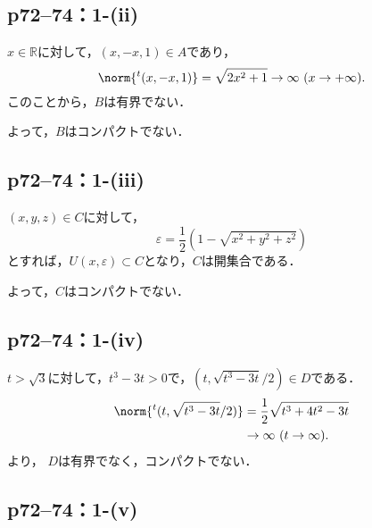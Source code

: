 \documentclass[a4paper,10pt,fleqn]{ltjsarticle}
\begin{document}
\subsection*{p72--74：1-(ii)}

\begin{tleftbar}
    $ x \in \mathbb{R}$に対して，$ (x,-x,1) \in A$であり，
    \[
        \norm{{}^t (x,-x,1)}=\sqrt{2x^2+1} \to \infty ~(x \to +\infty).
    \]
    このことから，$B$は有界でない．

    よって，$B$はコンパクトでない．
\end{tleftbar}


\subsection*{p72--74：1-(iii)}

\begin{tleftbar}
    $(x,y,z) \in C$に対して，
    \[
        \varepsilon =\frac{1}{2}(1-\sqrt{x^2+y^2+z^2})
    \]
    とすれば，$U(x,\varepsilon)\subset C$となり，$C$は開集合である．

    よって，$C$はコンパクトでない．
\end{tleftbar}



\subsection*{p72--74：1-(iv)}

\begin{tleftbar}
    $t>\sqrt{3}$に対して，$t^3 -3t >0$で，$(t,\sqrt{t^3-3t}/2) \in D$である．
    \begin{align*}
        \norm{{}^t (t,\sqrt{t^3-3t}/2)} & = \frac{1}{2}\sqrt{t^3+4t^2-3t} \\
                                        & \to  \infty ~(t \to \infty).
    \end{align*}
    より， $D$は有界でなく，コンパクトでない．
\end{tleftbar}


\subsection*{p72--74：1-(v)}
\end{document}
